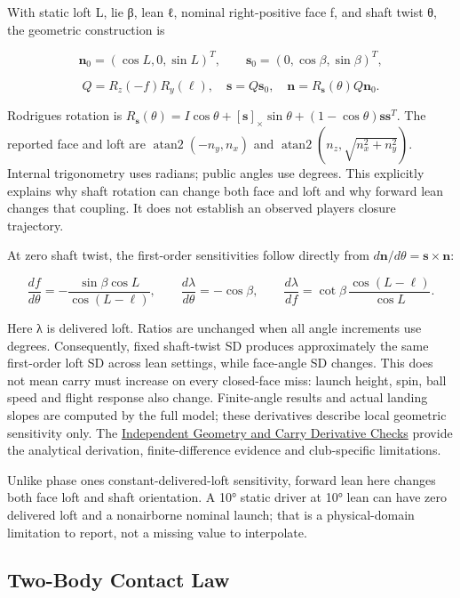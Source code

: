 \documentclass[
]{article}
\begin{document}
With static loft L, lie β, lean ℓ, nominal right-positive face f, and
shaft twist θ, the geometric construction is

\[\mathbf n_0=(\cos L,0,\sin L)^T,\qquad
\mathbf s_0=(0,\cos\beta,\sin\beta)^T,\]

\[Q=R_z(-f)R_y(\ell),\quad \mathbf s=Q\mathbf s_0,\quad
\mathbf n=R_{\mathbf s}(\theta)Q\mathbf n_0.\]

Rodrigues\textquotesingle{} rotation is
\(R_{\mathbf s}(\theta)=I\cos\theta+[\mathbf s]_\times\sin\theta+(1-\cos\theta)\mathbf s\mathbf s^T\).
The reported face and loft are \(\operatorname{atan2}(-n_y,n_x)\) and
\(\operatorname{atan2}(n_z,\sqrt{n_x^2+n_y^2})\). Internal trigonometry
uses radians; public angles use degrees. This explicitly explains why
shaft rotation can change both face and loft and why forward lean
changes that coupling. It does not establish an observed
player\textquotesingle s closure trajectory.

At zero shaft twist, the first-order sensitivities follow directly from
\(d\mathbf n/d\theta=\mathbf s\times\mathbf n\):

\[\frac{df}{d\theta}=-\frac{\sin\beta\cos L}{\cos(L-\ell)},\qquad
\frac{d\lambda}{d\theta}=-\cos\beta,\qquad
\frac{d\lambda}{df}=\cot\beta\,\frac{\cos(L-\ell)}{\cos L}.\]

Here λ is delivered loft. Ratios are unchanged when all angle increments
use degrees. Consequently, fixed shaft-twist SD produces approximately
the same first-order loft SD across lean settings, while face-angle SD
changes. This does not mean carry must increase on every closed-face
miss: launch height, spin, ball speed and flight response also change.
Finite-angle results and actual landing slopes are computed by the full
model; these derivatives describe local geometric sensitivity only. The
\href{validation/GEOMETRY_DERIVATIVES.md}{Independent Geometry and Carry
Derivative Checks} provide the analytical derivation, finite-difference
evidence and club-specific limitations.

Unlike phase one\textquotesingle s constant-delivered-loft sensitivity,
forward lean here changes both face loft and shaft orientation. A 10°
static driver at 10° lean can have zero delivered loft and a nonairborne
nominal launch; that is a physical-domain limitation to report, not a
missing value to interpolate.

\subsection{Two-Body Contact Law}\label{two-body-contact-law}
\end{document}
